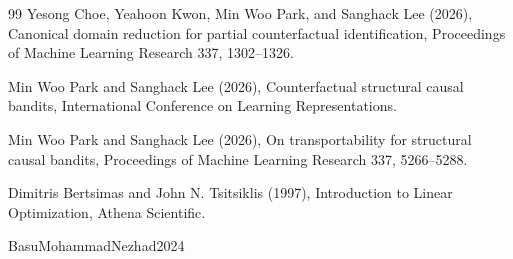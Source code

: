\documentclass{article}
\begin{document}
\begin{thebibliography}{99}
   Yesong Choe, Yeahoon Kwon, Min Woo Park, and Sanghack Lee (2026), Canonical domain reduction for partial counterfactual identification, Proceedings of Machine Learning Research 337, 1302--1326.

   Min Woo Park and Sanghack Lee (2026), Counterfactual structural causal bandits, International Conference on Learning Representations.

   Min Woo Park and Sanghack Lee (2026), On transportability for structural causal bandits, Proceedings of Machine Learning Research 337, 5266--5288.

   Dimitris Bertsimas and John N. Tsitsiklis (1997), Introduction to Linear Optimization, Athena Scientific.

   BasuMohammadNezhad2024

\end{thebibliography}
\end{document}

